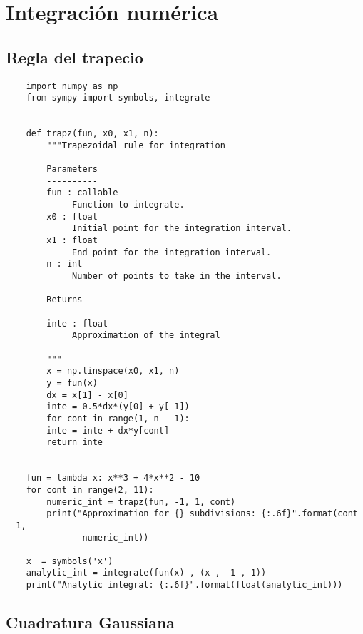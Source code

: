 \section{Integración numérica}

\subsection{Regla del trapecio}

\begin{verbatim}
    import numpy as np
    from sympy import symbols, integrate


    def trapz(fun, x0, x1, n):
        """Trapezoidal rule for integration
        
        Parameters
        ----------
        fun : callable
             Function to integrate.
        x0 : float
             Initial point for the integration interval.
        x1 : float
             End point for the integration interval.
        n : int
             Number of points to take in the interval.
        
        Returns
        -------
        inte : float
             Approximation of the integral
        
        """
        x = np.linspace(x0, x1, n)
        y = fun(x)
        dx = x[1] - x[0]
        inte = 0.5*dx*(y[0] + y[-1])
        for cont in range(1, n - 1):
        inte = inte + dx*y[cont]
        return inte


    fun = lambda x: x**3 + 4*x**2 - 10
    for cont in range(2, 11):
        numeric_int = trapz(fun, -1, 1, cont)
        print("Approximation for {} subdivisions: {:.6f}".format(cont - 1,
               numeric_int))

    x  = symbols('x')
    analytic_int = integrate(fun(x) , (x , -1 , 1))
    print("Analytic integral: {:.6f}".format(float(analytic_int)))
\end{verbatim}

\subsection{Cuadratura Gaussiana}

